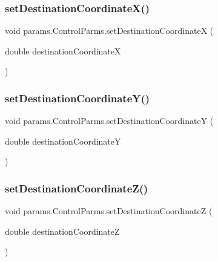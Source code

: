\subsubsection{\texorpdfstring{set\+Destination\+Coordinate\+X()}{setDestinationCoordinateX()}}
{\footnotesize\ttfamily void params.\+Control\+Parms.\+set\+Destination\+CoordinateX (\begin{DoxyParamCaption}\item[{double}]{destination\+CoordinateX }\end{DoxyParamCaption})}

\mbox{\label{classparams_1_1_control_parms_abb6dad3385885ee866020022ea8a2686}} 
\subsubsection{\texorpdfstring{set\+Destination\+Coordinate\+Y()}{setDestinationCoordinateY()}}
{\footnotesize\ttfamily void params.\+Control\+Parms.\+set\+Destination\+CoordinateY (\begin{DoxyParamCaption}\item[{double}]{destination\+CoordinateY }\end{DoxyParamCaption})}

\mbox{\label{classparams_1_1_control_parms_a803ea3480b1a8b08dd39b43911e4c649}} 
\subsubsection{\texorpdfstring{set\+Destination\+Coordinate\+Z()}{setDestinationCoordinateZ()}}
{\footnotesize\ttfamily void params.\+Control\+Parms.\+set\+Destination\+CoordinateZ (\begin{DoxyParamCaption}\item[{double}]{destination\+CoordinateZ }\end{DoxyParamCaption})}

